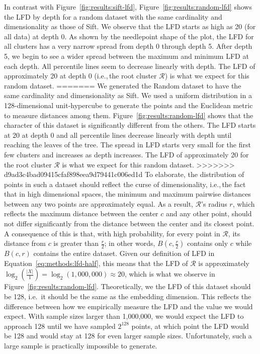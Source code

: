 In contrast with Figure~\ref{fig:results:sift-lfd}, Figure~\ref{fig:results:random-lfd} shows the LFD by depth for a random dataset with the same cardinality and dimensionality as those of Sift.
We observe that the LFD starts as high as 20 (for all data) at depth 0.
As shown by the needlepoint shape of the plot, the LFD for all clusters has a very narrow spread from depth 0 through depth 5.
After depth 5, we begin to see a wider spread between the maximum and minimum LFD at each depth.
All percentile lines seem to decrease linearly with depth.
The LFD of approximately 20 at depth 0 (i.e.,\,the root cluster $\mathcal{R}$) is what we expect for this random dataset.
=======
We generated the Random dataset to have the same cardinality and dimensionality as Sift.
We used a uniform distribution in a 128-dimensional unit-hypercube to generate the points and the Euclidean metric to measure distances among them.
Figure~\ref{fig:results:random-lfd} shows that the character of this dataset is significantly different from the others.
The LFD starts at 20 at depth 0 and all percentile lines decrease linearly with depth until reaching the leaves of the tree.
The spread in LFD starts very small for the first few clusters and increases as depth increases.
The LFD of approximately 20 for the root cluster $\mathcal{R}$ is what we expect for this random dataset.
>>>>>>> d9ad3c4bad09415cfaf898eea9d79441c006ed1d
To elaborate, the distribution of points in such a dataset should reflect the curse of dimensionality, i.e.,\,the fact that in high dimensional spaces, the minimum and maximum pairwise distances between any two points are approximately equal.
As a result, $\mathcal{R}$'s radius $r$, which reflects the maximum distance between the center $c$ and any other point, should not differ significantly from the distance between the center and its closest point.
A consequence of this is that, with high probability, for every point in $\mathcal{R}$, its distance from $c$ is greater than $\tfrac{r}{2}$;
in other words, $B(c, \tfrac{r}{2})$ contains only $c$ while $B(c, r)$ contains the entire dataset.
Given our definition of LFD in Equation~\ref{eq:methods:lfd-half}, this means that the LFD of $\mathcal{R}$ is approximately $\log_2(\frac{|X|}{1}) = \log_2(1,000,000) \approx 20$, which is what we observe in Figure~\ref{fig:results:random-lfd}.
Theoretically, we the LFD of this dataset should be 128, i.e.\, it should be the same as the embedding dimension.
This reflects the difference between how we empirically measure the LFD and the value we would expect.
With sample sizes larger than 1,000,000, we would expect the LFD to approach 128 until we have sampled $2^128$ points, at which point the LFD would be 128 and would stay at 128 for even larger sample sizes.
Unfortunately, such a large sample is practically impossible to generate.

